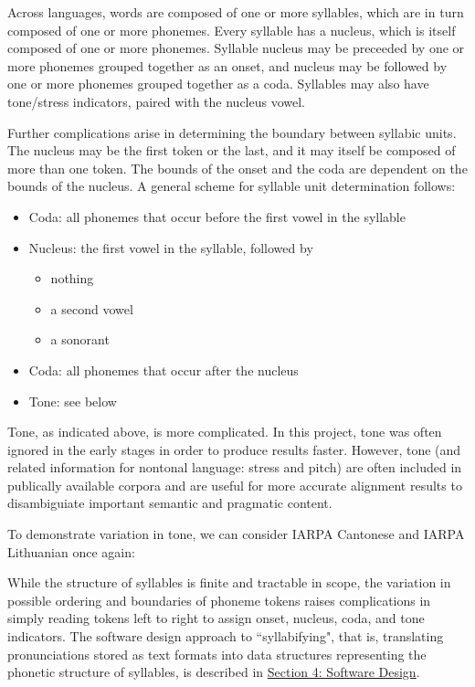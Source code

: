 \documentclass[11pt]{article}
\begin{document}
Across languages, words are composed of one or more syllables, which are in turn composed of one or more phonemes. Every syllable has a nucleus, which is itself composed of one or more phonemes. Syllable nucleus may be preceeded by one or more phonemes grouped together as an onset, and nucleus may be followed by one or more phonemes grouped together as a coda. Syllables may also have tone/stress indicators, paired with the nucleus vowel.

Further complications arise in determining the boundary between syllabic units. The nucleus may be the first token or the last, and it may itself be composed of more than one token. The bounds of the onset and the coda are dependent on the bounds of the nucleus. A general scheme for syllable unit determination follows:

\begin{itemize}
  \item Coda: all phonemes that occur before the first vowel in the syllable
  \item Nucleus: the first vowel in the syllable, followed by\begin{itemize}\item nothing\item a second vowel \item a sonorant\end{itemize}
  \item Coda: all phonemes that occur after the nucleus
  \item Tone: see below
\end{itemize}

Tone, as indicated above, is more complicated. In this project, tone was often ignored in the early stages in order to produce results faster. However, tone (and related information for nontonal language: stress and pitch) are often included in publically available corpora and are useful for more accurate alignment results to disambiguiate important semantic and pragmatic content.

To demonstrate variation in tone, we can consider IARPA Cantonese and IARPA Lithuanian once again:


While the structure of syllables is finite and tractable in scope, the variation in possible ordering and boundaries of phoneme tokens raises complications in simply reading tokens left to right to assign onset, nucleus, coda, and tone indicators. The software design approach to ``syllabifying", that is, translating pronunciations stored as text formats into data structures representing the phonetic structure of syllables, is described in \hyperlink{section.4}{Section 4: Software Design}.
\end{document}
